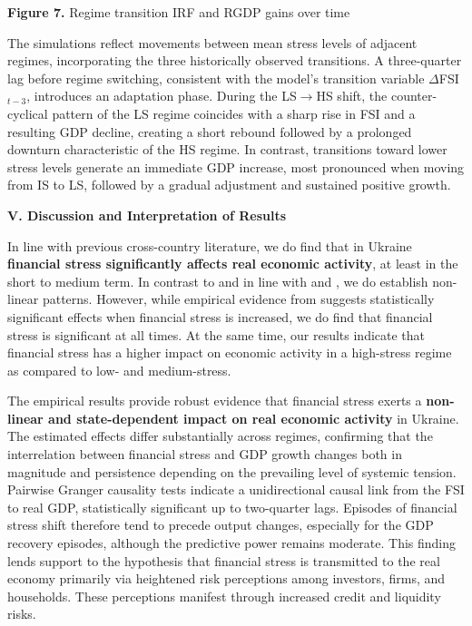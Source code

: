 \documentclass[12pt,preprint,aps,author-year]{revtex4-1}
\begin{document}
\textbf{Figure 7.} Regime transition IRF and RGDP gains over time

The simulations reflect movements between mean stress levels of adjacent regimes, incorporating the three historically observed transitions. A three-quarter lag before regime switching, consistent with the model’s transition variable $\Delta$FSI$_{t-3}$, introduces an adaptation phase. During the LS$\to$HS shift, the counter-cyclical pattern of the LS regime coincides with a sharp rise in FSI and a resulting GDP decline, creating a short rebound followed by a prolonged downturn characteristic of the HS regime. In contrast, transitions toward lower stress levels generate an immediate GDP increase, most pronounced when moving from IS to LS, followed by a gradual adjustment and sustained positive growth.

\textbf{V. Discussion and Interpretation of Results}

In line with previous cross-country literature, we do find that in Ukraine \textbf{financial stress significantly affects real economic activity}, at least in the short to medium term. In contrast to \cite{romer2017} and in line with \cite{ahir2023} and \cite{duprey2020}, we do establish non-linear patterns. However, while empirical evidence from \cite{ahir2023} suggests statistically significant effects when financial stress is increased, we do find that financial stress is significant at all times. At the same time, our results indicate that financial stress has a higher impact on economic activity in a high-stress regime as compared to low- and medium-stress.

The empirical results provide robust evidence that financial stress exerts a \textbf{non-linear and state-dependent impact on real economic activity} in Ukraine. The estimated effects differ substantially across regimes, confirming that the interrelation between financial stress and GDP growth changes both in magnitude and persistence depending on the prevailing level of systemic tension. Pairwise Granger causality tests indicate a unidirectional causal link from the FSI to real GDP, statistically significant up to two-quarter lags. Episodes of financial stress shift therefore tend to precede output changes, especially for the GDP recovery episodes, although the predictive power remains moderate. This finding lends support to the hypothesis that financial stress is transmitted to the real economy primarily via heightened risk perceptions among investors, firms, and households. These perceptions manifest through increased credit and liquidity risks.
\end{document}
